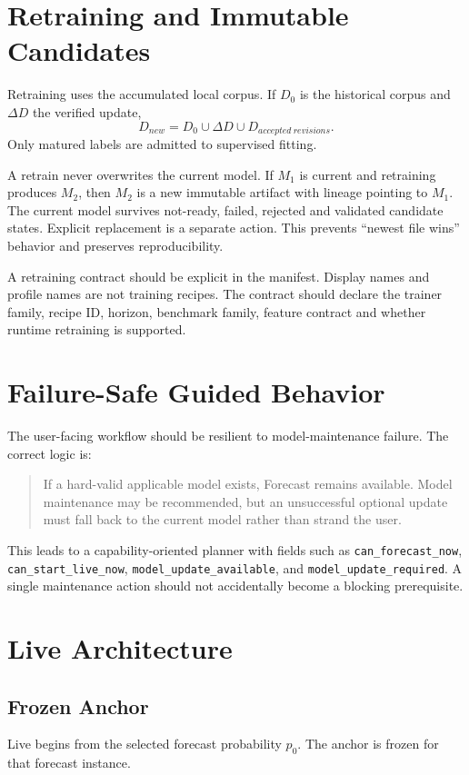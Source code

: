 \documentclass[11pt]{article}
\begin{document}
\section{Retraining and Immutable Candidates}
Retraining uses the accumulated local corpus. If $D_0$ is the historical corpus and $\Delta D$ the verified update,
\begin{equation}
D_{new}=D_0\cup \Delta D\cup D_{accepted\ revisions}.
\end{equation}
Only matured labels are admitted to supervised fitting.

A retrain never overwrites the current model. If $M_1$ is current and retraining produces $M_2$, then $M_2$ is a new immutable artifact with lineage pointing to $M_1$. The current model survives not-ready, failed, rejected and validated candidate states. Explicit replacement is a separate action. This prevents ``newest file wins'' behavior and preserves reproducibility.

A retraining contract should be explicit in the manifest. Display names and profile names are not training recipes. The contract should declare the trainer family, recipe ID, horizon, benchmark family, feature contract and whether runtime retraining is supported.

\section{Failure-Safe Guided Behavior}
The user-facing workflow should be resilient to model-maintenance failure. The correct logic is:
\begin{quote}
If a hard-valid applicable model exists, Forecast remains available. Model maintenance may be recommended, but an unsuccessful optional update must fall back to the current model rather than strand the user.
\end{quote}

This leads to a capability-oriented planner with fields such as \texttt{can\_forecast\_now}, \texttt{can\_start\_live\_now}, \texttt{model\_update\_available}, and \texttt{model\_update\_required}. A single maintenance action should not accidentally become a blocking prerequisite.

\section{Live Architecture}
\subsection{Frozen Anchor}
Live begins from the selected forecast probability $p_0$. The anchor is frozen for that forecast instance.
\end{document}

